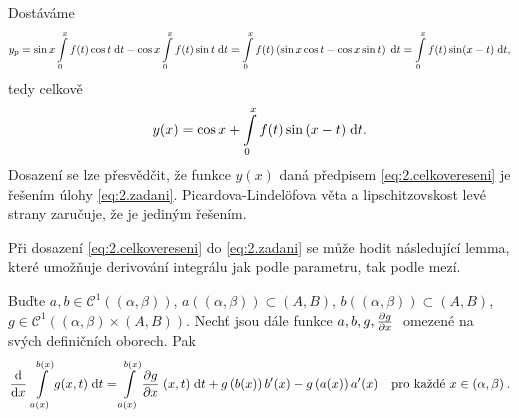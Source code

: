 Dostáváme
\begin{equation}
        y_p=\sin x \int\limits_0^xf(t)\cos t\;\mathrm{d}t-\cos x\int\limits_0^x f(t)\sin t\;\mathrm{d}t=\int\limits_0^x f(t)\left(\sin x \cos t-\cos x\sin t\right) \;\mathrm{d}t= \int\limits_0^xf(t) \sin(x-t)\;\mathrm{d}t,
\end{equation}
tedy celkově
\begin{equation}
    y(x)=\cos x+\int\limits_0^x f(t)\sin{(x-t)}\;\mathrm{d}t.
    \label{eq:2.celkovereseni}
\end{equation}
Dosazení se lze přesvědčit, že funkce $y(x)$ daná předpisem \eqref{eq:2.celkovereseni} je řešením úlohy \eqref{eq:2.zadani}. Picardova-Lindelöfova věta a lipschitzovskost levé strany zaručuje, že je jediným řešením.

\begin{remark}
Při dosazení \eqref{eq:2.celkovereseni} do \eqref{eq:2.zadani} se může hodit následující lemma, které umožňuje derivování integrálu jak podle parametru, tak podle mezí.
\end{remark}
\begin{lemma}
\label{lemma:2.derivacemezi}
Buďte $a,b\in\mathcal{C}^1((\alpha,\beta))$, $a((\alpha,\beta))\subset (A,B)$, $b((\alpha,\beta))\subset (A,B)$, $g\in\mathcal{C}^1((\alpha,\beta)\times(A,B))$. Nechť jsou dále funkce $a,b,g,\frac{\partial g}{\partial x} \;$ omezené na svých definičních oborech. Pak
\begin{align}
    \frac{\mathrm{d} }{\mathrm{d} x} \;\int\limits_{a(x)}^{b(x)} g(x,t)\;\mathrm{d}t = \int\limits_{a(x)}^{b(x)} \frac{\partial g}{\partial x} \;(x,t)\;\mathrm{d}t + g \left( b(x) \right) b'(x)-g \left( a(x) \right) a'(x) \quad \text{pro každé } x\in(\alpha,\beta) \:.
\end{align}
\end{lemma}

